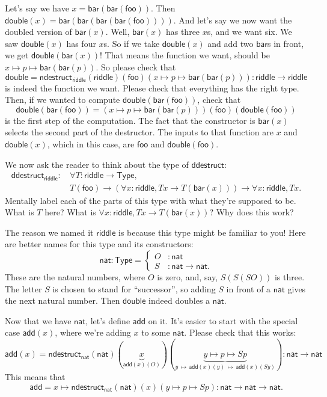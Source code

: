 \documentclass[11pt,paper=letter]{scrartcl}
\renewcommand{\sf}{\mathsf}
\newcommand{\type}{\mathsf{Type}}
\newcommand{\smapsto}{\,\mapsto\,}
\begin{document}
Let's say we have $x = \sf{bar}(\sf{bar}(\sf{foo}))$. Then $\sf{double}(x) = \sf{bar}(\sf{bar}(\sf{bar}(\sf{bar}(\sf{foo}))))$. And let's say we now want the doubled version of $\sf{bar}(x)$. Well, $\sf{bar}(x)$ has three $x$s, and we want six. We saw $\sf{double}(x)$ has four $x$s. So if we take $\sf{double}(x)$ and add two $\sf{bar}$s in front, we get $\sf{double}(\sf{bar}(x))$! That means the function we want, should be $x \mapsto p \mapsto \sf{bar}(\sf{bar}(p))$. So please check that \[
\sf{double}
= \sf{ndestruct}_\sf{riddle}(\sf{riddle})(\sf{foo})(x \mapsto p \mapsto \sf{bar}(\sf{bar}(p))) : \sf{riddle} \to \sf{riddle}
\]
is indeed the function we want. Please check that everything has the right type. Then, if we wanted to compute $\sf{double}(\sf{bar}(\sf{foo}))$, check that \[
  \sf{double}(\sf{bar}(\sf{foo}))
  = (x \mapsto p \mapsto \sf{bar}(\sf{bar}(p)))
  (\sf{foo})(\sf{double}(\sf{foo}))
\]
is the first step of the computation. The fact that the constructor is $\sf{bar}(x)$ selects the second part of the destructor. The inputs to that function are $x$ and $\sf{double}(x)$, which in this case, are $\sf{foo}$ and $\sf{double}(\sf{foo})$.

We now ask the reader to think about the type of $\sf{ddestruct}$:
\begin{align*}
\sf{ddestruct}_{\sf{riddle}}:\,
& \forall T: \sf{riddle} \to \type,\\
&T(\sf{foo}) \to (\forall x: \sf{riddle}, Tx \to T(\sf{bar}(x))) \to \forall x: \sf{riddle}, Tx.
\end{align*}
Mentally label each of the parts of this type with what they're supposed to be. What is $T$ here? What is $\forall x: \sf{riddle}, Tx \to T(\sf{bar}(x))$? Why does this work?

The reason we named it $\sf{riddle}$ is because this type might be familiar to you! Here are better names for this type and its constructors: \[
  \sf{nat} : \type = \begin{cases}
    O &: \sf{nat} \\
    S &: \sf{nat} \to \sf{nat}.
  \end{cases}
\]
These are the natural numbers, where $O$ is zero, and, say, $S(S(SO))$ is three. The letter $S$ is chosen to stand for ``successor'', so adding $S$ in front of a $\sf{nat}$ gives the next natural number. Then $\sf{double}$ indeed doubles a $\sf{nat}$.

Now that we have $\sf{nat}$, let's define $\sf{add}$ on it. It's easier to start with the special case $\sf{add}(x)$, where we're adding $x$ to some $\sf{nat}$. Please check that this works: \[
  \sf{add}(x) = \sf{ndestruct}_\sf{nat}(\sf{nat})
  (\underbrace{x}_{\sf{add}(x)(O)})
  (\underbrace{y \mapsto p \mapsto Sp}_{y\smapsto\sf{add}(x)(y)\smapsto\sf{add}(x)(Sy)}) : \sf{nat} \to \sf{nat}
\]
This means that \[
  \sf{add} = x \mapsto \sf{ndestruct}_\sf{nat}(\sf{nat})(x)(y \mapsto p \mapsto Sp) : \sf{nat} \to \sf{nat} \to \sf{nat}.
\]
\end{document}
